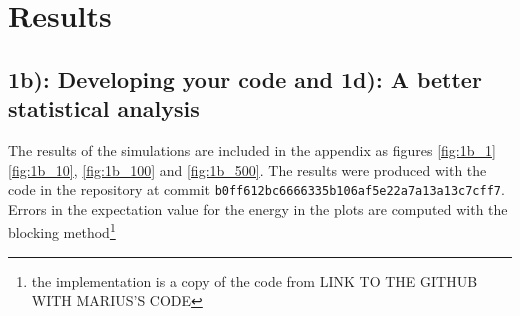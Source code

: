 \section{Results}
\subsection*{\textbf{1b):} Developing your code and \textbf{1d):} A better statistical analysis}

The results of the simulations are included in the appendix as figures \ref{fig:1b_1} \ref{fig:1b_10}, \ref{fig:1b_100} and \ref{fig:1b_500}. The results were produced with the code in the repository at commit 
\lstinline{b0ff612bc6666335b106af5e22a7a13a13c7cff7}. Errors in the expectation value for the energy in the plots are computed with the blocking method\footnote{the implementation is a copy of the code from LINK TO THE GITHUB WITH MARIUS'S CODE} 